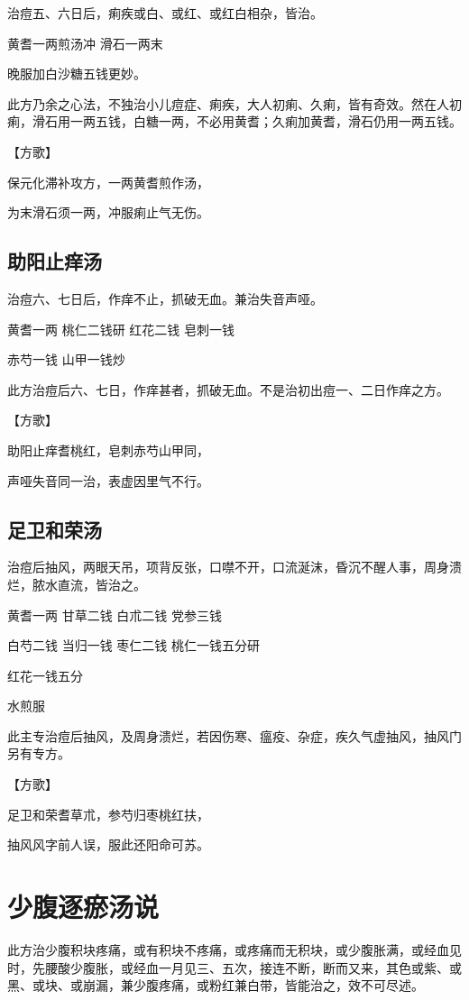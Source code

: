 \documentclass[a4paper,12pt,UTF8,twoside]{ctexbook}
\begin{document}
	
	治痘五、六日后，痢疾或白、或红、或红白相杂，皆治。
	
	黄耆一两煎汤冲 滑石一两末
	
	晚服加白沙糖五钱更妙。
	
	此方乃余之心法，不独治小儿痘症、痢疾，大人初痢、久痢，皆有奇效。然在人初痢，滑石用一两五钱，白糖一两，不必用黄耆；久痢加黄耆，滑石仍用一两五钱。
	
	【方歌】
	
	保元化滞补攻方，一两黄耆煎作汤，
	
	为末滑石须一两，冲服痢止气无伤。
	
	\section{助阳止痒汤}
	
	
	治痘六、七日后，作痒不止，抓破无血。兼治失音声哑。
	
	黄耆一两 桃仁二钱研 红花二钱 皂刺一钱
	
	赤芍一钱 山甲一钱炒
	
	此方治痘后六、七日，作痒甚者，抓破无血。不是治初出痘一、二日作痒之方。
	
	【方歌】
	
	助阳止痒耆桃红，皂刺赤芍山甲同，
	
	声哑失音同一治，表虚因里气不行。
	
	\section{足卫和荣汤}
	
	
	治痘后抽风，两眼天吊，项背反张，口噤不开，口流涎沫，昏沉不醒人事，周身溃烂，脓水直流，皆治之。
	
	黄耆一两 甘草二钱 白朮二钱 党参三钱
	
	白芍二钱 当归一钱 枣仁二钱 桃仁一钱五分研
	
	红花一钱五分
	
	水煎服
	
	此主专治痘后抽风，及周身溃烂，若因伤寒、瘟疫、杂症，疾久气虚抽风，抽风门另有专方。
	
	【方歌】
	
	足卫和荣耆草朮，参芍归枣桃红扶，
	
	抽风风字前人误，服此还阳命可苏。
	
	\chapter{少腹逐瘀汤说}
	
	
	此方治少腹积块疼痛，或有积块不疼痛，或疼痛而无积块，或少腹胀满，或经血见时，先腰酸少腹胀，或经血一月见三、五次，接连不断，断而又来，其色或紫、或黑、或块、或崩漏，兼少腹疼痛，或粉红兼白带，皆能治之，效不可尽述。
	
\end{document}
